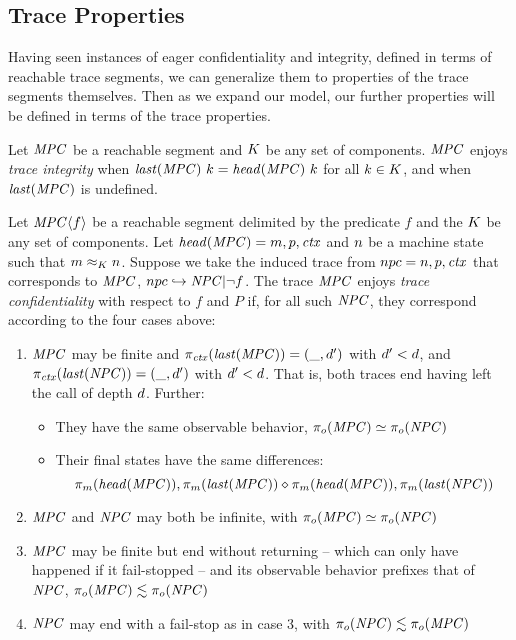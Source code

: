\documentclass[acmsmall,review,anonymous]{acmart}\settopmatter{printfolios=true,printccs=false,printacmref=false}
\begin{document}
\subsection{Trace Properties}

Having seen instances of eager confidentiality and integrity, defined in terms of reachable trace
segments, we can generalize them to properties of the trace segments themselves. Then as we expand
our model, our further properties will be defined in terms of the trace properties.

 Let \(\mathit{MPC}\) be a reachable segment and \(K\) be any set of components.
\(\mathit{MPC}\) enjoys {\em trace integrity} when \(\mathit{last}(\mathit{MPC}) ~ k = \mathit{head}(\mathit{MPC}) ~ k\)
for all \(k \in K\), and when \(\mathit{last}(\mathit{MPC})\) is undefined.

 Let \(\mathit{MPC} \langle f \rangle\) be a reachable segment delimited by the predicate \(f\)
and the \(K\) be any set of components. Let \(\mathit{head}(\mathit{MPC}) = m,p,\mathit{ctx}\)
and \(n\) be a machine state such that \(m \approx_K n\). Suppose we take the
induced trace from \(npc = n,p,\mathit{ctx}\) that corresponds to \(\mathit{MPC}\),
\(npc \hookrightarrow \mathit{NPC} | \neg f\). The trace \(\mathit{MPC}\) enjoys {\em trace confidentiality}
with respect to \(f\) and \(P\) if, for all such \(\mathit{NPC}\), they correspond according to the four cases
above:

\begin{enumerate}
\item \(\mathit{MPC}\) may be finite and \(\pi_{\mathit{ctx}}(\mathit{last}(\mathit{MPC})) = (\_,d')\) with \(d' < d\),
  and \(\pi_{\mathit{ctx}}(\mathit{last}(\mathit{NPC})) = (\_,d')\) with \(d' < d\). That is, both traces end
  having left the call of depth \(d\). Further:
  \begin{itemize}
  \item They have the same observable behavior, \(\pi_o(\mathit{MPC}) \simeq \pi_o(\mathit{NPC})\)
  \item Their final states have the same differences:
    \[\pi_m(\mathit{head}(\mathit{MPC})), \pi_m(\mathit{last}(\mathit{MPC})) \diamond
    \pi_m(\mathit{head}(\mathit{MPC})), \pi_m(\mathit{last}(\mathit{NPC}))\]
  \end{itemize}
\item \(\mathit{MPC}\) and \(\mathit{NPC}\) may both be infinite, with \(\pi_o(\mathit{MPC}) \simeq \pi_o(\mathit{NPC})\)
\item \(\mathit{MPC}\) may be finite but end without returning -- which can only have happened if it fail-stopped --
  and its observable behavior prefixes that of \(\mathit{NPC}\), \(\pi_o(\mathit{MPC}) \lesssim \pi_o(\mathit{NPC})\)
\item \(\mathit{NPC}\) may end with a fail-stop as in case 3, with \(\pi_o(\mathit{NPC}) \lesssim \pi_o(\mathit{MPC})\)
\end{enumerate}
\end{document}
